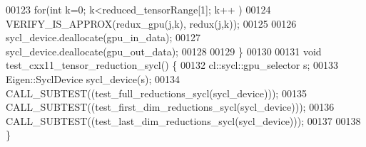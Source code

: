 \begin{DoxyCode}
00123     \textcolor{keywordflow}{for}(\textcolor{keywordtype}{int} k=0; k<reduced\_tensorRange[1]; k++ )
00124       VERIFY\_IS\_APPROX(redux\_gpu(j,k), redux(j,k));
00125 
00126   sycl\_device.deallocate(gpu\_in\_data);
00127   sycl\_device.deallocate(gpu\_out\_data);
00128 
00129 \}
00130 
00131 \textcolor{keywordtype}{void} test\_cxx11\_tensor\_reduction\_sycl() \{
00132   cl::sycl::gpu\_selector s;
00133   Eigen::SyclDevice sycl\_device(s);
00134   CALL\_SUBTEST((test\_full\_reductions\_sycl(sycl\_device)));
00135   CALL\_SUBTEST((test\_first\_dim\_reductions\_sycl(sycl\_device)));
00136   CALL\_SUBTEST((test\_last\_dim\_reductions\_sycl(sycl\_device)));
00137 
00138 \}
\end{DoxyCode}
